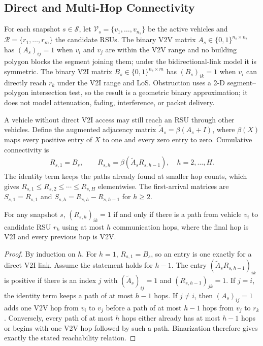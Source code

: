 \documentclass[engproc,proceedingpaper,submit,oneauthor]{Definitions/mdpi}
\newcommand{\Atil}{\widetilde{A}}
\newcommand{\bin}[1]{\beta\!\left(#1\right)}
\begin{document}
\subsection{Direct and Multi-Hop Connectivity}
For each snapshot $s\in\mathcal S$, let $\mathcal V_s=\{v_1,\ldots,v_{n_s}\}$ be the
active vehicles and $\mathcal R=\{r_1,\ldots,r_m\}$ the candidate RSUs. The binary V2V
matrix $A_s\in\{0,1\}^{n_s\times n_s}$ has $(A_s)_{ij}=1$ when $v_i$ and $v_j$ are
within the V2V range and no building polygon blocks the segment joining them; under the
bidirectional-link model it is symmetric. The binary V2I matrix
$B_s\in\{0,1\}^{n_s\times m}$ has $(B_s)_{ik}=1$ when $v_i$ can directly reach $r_k$
under the V2I range and LoS. Obstruction uses a 2-D segment--polygon intersection test,
so the result is a geometric binary approximation; it does not model attenuation,
fading, interference, or packet delivery.

A vehicle without direct V2I access may still reach an RSU through other vehicles.
Define the augmented adjacency matrix $\Atil_s=\bin{A_s+I}$, where $\beta(X)$ maps
every positive entry of $X$ to one and every zero entry to zero. Cumulative
connectivity is
\begin{align}
R_{s,1} = B_s,\qquad
R_{s,h} = \bin{\Atil_s R_{s,h-1}},\quad h=2,\ldots,H.\label{eq:rh}
\end{align}
The identity term keeps the paths already found at smaller hop counts, which gives
$R_{s,1}\le R_{s,2}\le\cdots\le R_{s,H}$ elementwise. The first-arrival matrices are
$S_{s,1}=R_{s,1}$ and $S_{s,h}=R_{s,h}-R_{s,h-1}$ for $h\ge 2$.

\begin{Proposition}\label{prop:reachability}
For any snapshot $s$, $(R_{s,h})_{ik}=1$ if and only if there is a path from vehicle
$v_i$ to candidate RSU $r_k$ using at most $h$ communication hops, where the final hop
is V2I and every previous hop is V2V.
\end{Proposition}

\begin{proof}
By induction on $h$. For $h=1$, $R_{s,1}=B_s$, so an entry is one exactly for a direct
V2I link. Assume the statement holds for $h-1$. The entry $(\Atil_s R_{s,h-1})_{ik}$
is positive if there is an index $j$ with $(\Atil_s)_{ij}=1$ and $(R_{s,h-1})_{jk}=1$.
If $j=i$, the identity term keeps a path of at most $h-1$ hops. If $j\neq i$, then
$(A_s)_{ij}=1$ adds one V2V hop from $v_i$ to $v_j$ before a path of at most $h-1$ hops
from $v_j$ to $r_k$. Conversely, every path of at most $h$ hops either already has at
most $h-1$ hops or begins with one V2V hop followed by such a path. Binarization
therefore gives exactly the stated reachability relation.
\end{proof}
\end{document}
